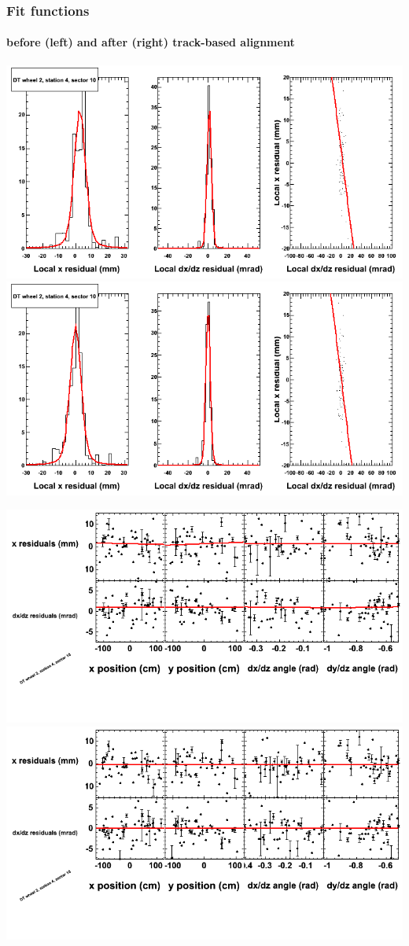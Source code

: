 \documentclass[compress]{beamer}
\begin{document}
\begin{frame}
\frametitle{Fit functions}
\framesubtitle{before (left) and after (right) track-based alignment}
\includegraphics[width=0.5\linewidth]{fitfunctions_re01/MBwhEst4sec10_bellcurves.png} \includegraphics[width=0.5\linewidth]{fitfunctions_re05/MBwhEst4sec10_bellcurves.png}

\includegraphics[width=0.5\linewidth]{fitfunctions_re01/MBwhEst4sec10_polynomials.png} \includegraphics[width=0.5\linewidth]{fitfunctions_re05/MBwhEst4sec10_polynomials.png}
\end{frame}
\end{document}
